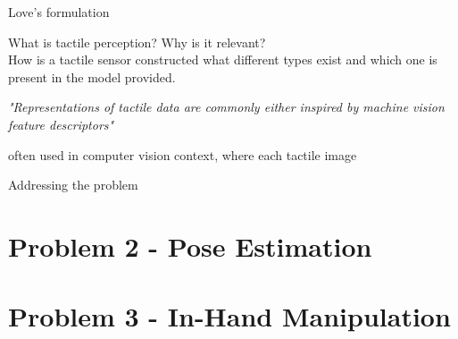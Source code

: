 









Love's formulation 




What is tactile perception? Why is it relevant? \\
How is a tactile sensor constructed \cite{recent-progress-in-technologies-for-tactile-sensors}
what different types exist and which one is present in the model provided.


\textit{"Representations of tactile data are commonly either inspired by machine vision feature descriptors"}

often used in computer vision context, where each tactile image 

Addressing the problem 





\section{Problem 2 - Pose Estimation} \label{sec:lit-rev-problem-2}

\section{Problem 3 - In-Hand Manipulation} \label{sec:lit-rev-problem-3}